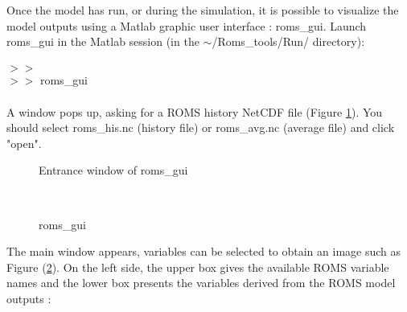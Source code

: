 Once the model has run, or during the simulation, it is possible
to visualize the model outputs using a Matlab graphic user interface : 
roms\_gui. Launch roms\_gui in the Matlab session 
(in the  $\sim$/Roms\_tools/Run/ directory):
\\ \\
$>>$ \\
$>>$ roms\_gui
\\\\
A window pops up, asking for a ROMS history NetCDF file (Figure \ref{fig:open}).
You should select roms\_his.nc (history file) or roms\_avg.nc (average file) and
click "open".
\begin{figure}[!ht]
\centerline{}
\caption{Entrance window of roms\_gui}
\label{fig:open}
\end{figure}
\\
\begin{figure}[!ht]
\centerline{}
\caption{roms\_gui}
\label{fig:romsgui}
\end{figure}

The main window appears, variables can be selected to obtain an image such as
Figure (\ref{fig:romsgui}). On the left side, the upper box  gives the available 
ROMS variable names and the lower box presents the variables derived from the
ROMS model outputs :

